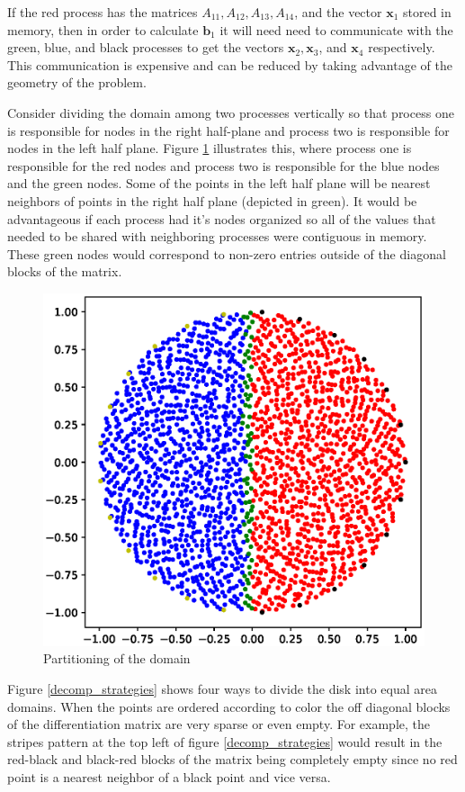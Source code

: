 \documentclass[12pt]{article}
\let\vec\mathbf
\begin{document}



If the red process has the matrices $A_{11}, A_{12}, A_{13}, A_{14}$, and the vector $\vec{x}_1$ stored in memory, then in order to calculate $\vec{b}_1$ it will need need to communicate with the green, blue, and black processes to get the vectors $\vec{x}_2, \vec{x}_3$, and $\vec{x}_4$ respectively. This communication is expensive and can be reduced by taking advantage of the geometry of the problem.

Consider dividing the domain among two processes vertically so that process one is responsible for nodes in the right half-plane and process two is responsible for nodes in the left half plane. Figure \ref{dsik_two_proc} illustrates this, where process one is responsible for the red nodes and process two is responsible for the blue nodes and the green nodes. Some of the points in the left half plane will be nearest neighbors of points in the right half plane (depicted in green). It would be advantageous if each process had it's nodes organized so all of the values that needed to be shared with neighboring processes were contiguous in memory. These green nodes would correspond to non-zero entries outside of the diagonal blocks of the matrix.

\begin{figure}[!b]
	\centering
	\includegraphics[width=.5\textwidth]{nearest_2proc_disk.eps}
	\caption{Partitioning of the domain }
	\label{dsik_two_proc}
\end{figure}

Figure \ref{decomp_strategies} shows four ways to divide the disk into equal area domains. When the points are ordered according to color the off diagonal blocks of the differentiation matrix are very sparse or even empty. For example, the stripes pattern at the top left of figure \ref{decomp_strategies} would result in the red-black and black-red blocks of the matrix being completely empty since no red point is a nearest neighbor of a black point and vice versa. 
\end{document}
